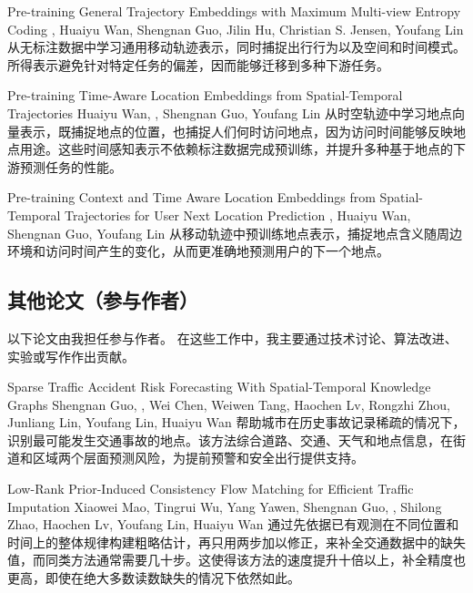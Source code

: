 {Pre-training General Trajectory Embeddings with Maximum Multi-view Entropy Coding}
{\me, Huaiyu Wan, Shengnan Guo, Jilin Hu, Christian S. Jensen, Youfang Lin}
{从无标注数据中学习通用移动轨迹表示，同时捕捉出行行为以及空间和时间模式。所得表示避免针对特定任务的偏差，因而能够迁移到多种下游任务。}

{Pre-training Time-Aware Location Embeddings from Spatial-Temporal Trajectories}
{Huaiyu Wan, \me, Shengnan Guo, Youfang Lin}
{从时空轨迹中学习地点向量表示，既捕捉地点的位置，也捕捉人们何时访问地点，因为访问时间能够反映地点用途。这些时间感知表示不依赖标注数据完成预训练，并提升多种基于地点的下游预测任务的性能。}

{Pre-training Context and Time Aware Location Embeddings from Spatial-Temporal Trajectories for User Next Location Prediction}
{\me, Huaiyu Wan, Shengnan Guo, Youfang Lin}
{从移动轨迹中预训练地点表示，捕捉地点含义随周边环境和访问时间产生的变化，从而更准确地预测用户的下一个地点。}

\subsection*{其他论文（参与作者）}
以下论文由我担任参与作者。
在这些工作中，我主要通过技术讨论、算法改进、实验或写作作出贡献。

{Sparse Traffic Accident Risk Forecasting With Spatial-Temporal Knowledge Graphs}
{Shengnan Guo, \me, Wei Chen, Weiwen Tang, Haochen Lv, Rongzhi Zhou, Junliang Lin, Youfang Lin, Huaiyu Wan}
{帮助城市在历史事故记录稀疏的情况下，识别最可能发生交通事故的地点。该方法综合道路、交通、天气和地点信息，在街道和区域两个层面预测风险，为提前预警和安全出行提供支持。}

{Low-Rank Prior-Induced Consistency Flow Matching for Efficient Traffic Imputation}
{Xiaowei Mao, Tingrui Wu, Yang Yawen, Shengnan Guo, \me, Shilong Zhao, Haochen Lv, Youfang Lin, Huaiyu Wan}
{通过先依据已有观测在不同位置和时间上的整体规律构建粗略估计，再只用两步加以修正，来补全交通数据中的缺失值，而同类方法通常需要几十步。这使得该方法的速度提升十倍以上，补全精度也更高，即使在绝大多数读数缺失的情况下依然如此。}

